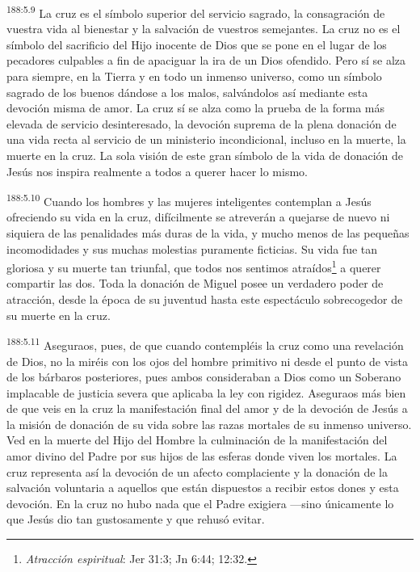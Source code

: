 \par
\textsuperscript{188:5.9} La cruz es el símbolo superior del servicio sagrado, la consagración de vuestra vida al bienestar y la salvación de vuestros semejantes. La cruz no es el símbolo del sacrificio del Hijo inocente de Dios que se pone en el lugar de los pecadores culpables a fin de apaciguar la ira de un Dios ofendido. Pero sí se alza para siempre, en la Tierra y en todo un inmenso universo, como un símbolo sagrado de los buenos dándose a los malos, salvándolos así mediante esta devoción misma de amor. La cruz sí se alza como la prueba de la forma más elevada de servicio desinteresado, la devoción suprema de la plena donación de una vida recta al servicio de un ministerio incondicional, incluso en la muerte, la muerte en la cruz. La sola visión de este gran símbolo de la vida de donación de Jesús nos inspira realmente a todos a querer hacer lo mismo.

\par
\textsuperscript{188:5.10} Cuando los hombres y las mujeres inteligentes contemplan a Jesús ofreciendo su vida en la cruz, difícilmente se atreverán a quejarse de nuevo ni siquiera de las penalidades más duras de la vida, y mucho menos de las pequeñas incomodidades y sus muchas molestias puramente ficticias. Su vida fue tan gloriosa y su muerte tan triunfal, que todos nos sentimos atraídos\footnote{\textit{Atracción espiritual}: Jer 31:3; Jn 6:44; 12:32.} a querer compartir las dos. Toda la donación de Miguel posee un verdadero poder de atracción, desde la época de su juventud hasta este espectáculo sobrecogedor de su muerte en la cruz.

\par
\textsuperscript{188:5.11} Aseguraos, pues, de que cuando contempléis la cruz como una revelación de Dios, no la miréis con los ojos del hombre primitivo ni desde el punto de vista de los bárbaros posteriores, pues ambos consideraban a Dios como un Soberano implacable de justicia severa que aplicaba la ley con rigidez. Aseguraos más bien de que veis en la cruz la manifestación final del amor y de la devoción de Jesús a la misión de donación de su vida sobre las razas mortales de su inmenso universo. Ved en la muerte del Hijo del Hombre la culminación de la manifestación del amor divino del Padre por sus hijos de las esferas donde viven los mortales. La cruz representa así la devoción de un afecto complaciente y la donación de la salvación voluntaria a aquellos que están dispuestos a recibir estos dones y esta devoción. En la cruz no hubo nada que el Padre exigiera ---sino únicamente lo que Jesús dio tan gustosamente y que rehusó evitar.

